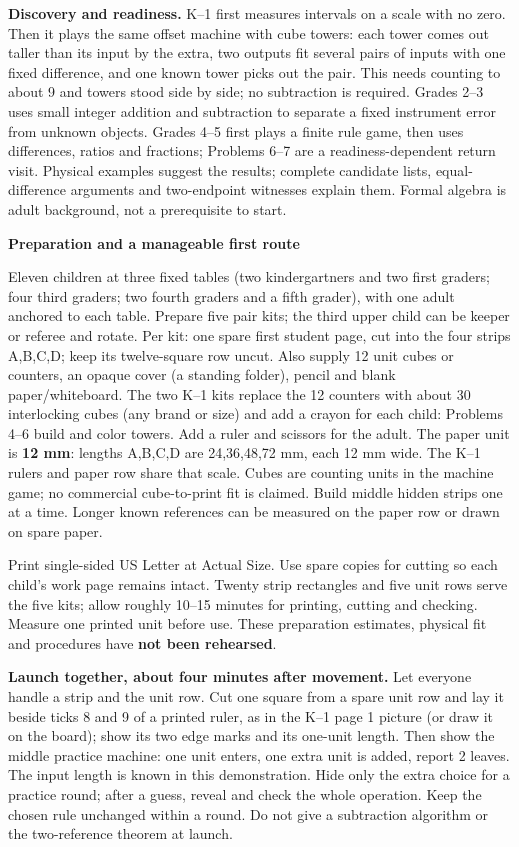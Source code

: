 \documentclass[letterpaper,11pt]{article}
\newcommand{\topic}[1]{\par\medskip\textbf{#1}\par}
\begin{document}
\textbf{Discovery and readiness.} K--1 first measures intervals on a scale with no zero. Then it plays the same offset machine with cube towers: each tower comes out taller than its input by the extra, two outputs fit several pairs of inputs with one fixed difference, and one known tower picks out the pair. This needs counting to about 9 and towers stood side by side; no subtraction is required. Grades 2--3 uses small integer addition and subtraction to separate a fixed instrument error from unknown objects. Grades 4--5 first plays a finite rule game, then uses differences, ratios and fractions; Problems 6--7 are a readiness-dependent return visit. Physical examples suggest the results; complete candidate lists, equal-difference arguments and two-endpoint witnesses explain them. Formal algebra is adult background, not a prerequisite to start.
\newpage
\topic{Preparation and a manageable first route}
Eleven children at three fixed tables (two kindergartners and two first graders; four third graders; two fourth graders and a fifth grader), with one adult anchored to each table. Prepare five pair kits; the third upper child can be keeper or referee and rotate. Per kit: one spare first student page, cut into the four strips A,B,C,D; keep its twelve-square row uncut. Also supply 12 unit cubes or counters, an opaque cover (a standing folder), pencil and blank paper/whiteboard. The two K--1 kits replace the 12 counters with about 30 interlocking cubes (any brand or size) and add a crayon for each child: Problems 4--6 build and color towers. Add a ruler and scissors for the adult. The paper unit is \textbf{12 mm}: lengths A,B,C,D are 24,36,48,72 mm, each 12 mm wide. The K--1 rulers and paper row share that scale. Cubes are counting units in the machine game; no commercial cube-to-print fit is claimed. Build middle hidden strips one at a time. Longer known references can be measured on the paper row or drawn on spare paper.

Print single-sided US Letter at Actual Size. Use spare copies for cutting so each child's work page remains intact. Twenty strip rectangles and five unit rows serve the five kits; allow roughly 10--15 minutes for printing, cutting and checking. Measure one printed unit before use. These preparation estimates, physical fit and procedures have \textbf{not been rehearsed}.

\textbf{Launch together, about four minutes after movement.} Let everyone handle a strip and the unit row. Cut one square from a spare unit row and lay it beside ticks 8 and 9 of a printed ruler, as in the K--1 page 1 picture (or draw it on the board); show its two edge marks and its one-unit length. Then show the middle practice machine: one unit enters, one extra unit is added, report 2 leaves. The input length is known in this demonstration. Hide only the extra choice for a practice round; after a guess, reveal and check the whole operation. Keep the chosen rule unchanged within a round. Do not give a subtraction algorithm or the two-reference theorem at launch.
\end{document}
